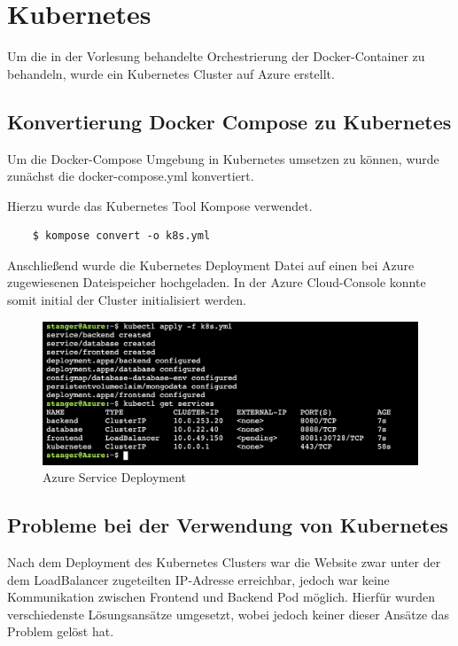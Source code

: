 \chapter{Kubernetes}

Um die in der Vorlesung behandelte Orchestrierung der Docker-Container zu behandeln, wurde ein Kubernetes Cluster auf Azure erstellt.

\section{Konvertierung Docker Compose zu Kubernetes}

Um die Docker-Compose Umgebung in Kubernetes umsetzen zu können, wurde zunächst die docker-compose.yml konvertiert.

Hierzu wurde das Kubernetes Tool Kompose verwendet.

\begin{verbatim}
	$ kompose convert -o k8s.yml
\end{verbatim}

Anschließend wurde die Kubernetes Deployment Datei auf einen bei Azure zugewiesenen Dateispeicher hochgeladen. In der Azure Cloud-Console konnte somit initial der Cluster initialisiert werden.

\begin{figure}[h!]
 \centering
 \includegraphics[width=150mm]{images/azure.png}
 \caption{Azure Service Deployment}
 \label{fig:azure-deployment}
\end{figure}

\section{Probleme bei der Verwendung von Kubernetes}
Nach dem Deployment des Kubernetes Clusters war die Website zwar unter der dem LoadBalancer zugeteilten IP-Adresse erreichbar, jedoch war keine Kommunikation zwischen Frontend und Backend Pod möglich. Hierfür wurden verschiedenste Lösungsansätze umgesetzt, wobei jedoch keiner dieser Ansätze das Problem gelöst hat. 

